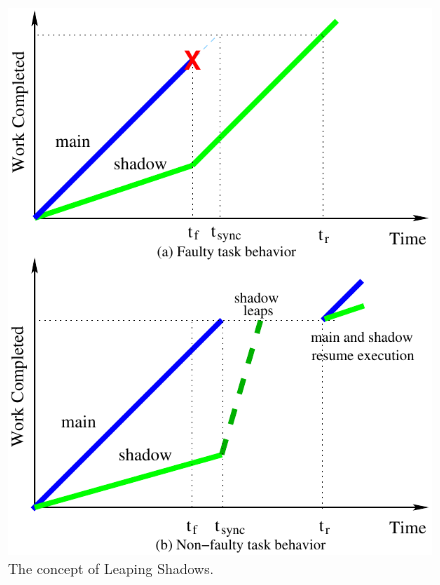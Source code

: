 \begin{figure}[!t]
	\begin{center}
			\includegraphics[width=0.8\columnwidth]{Figures/jump.pdf}
	\end{center}
	\caption{The concept of Leaping Shadows.}
	\label{fig:leap}
\end{figure}

